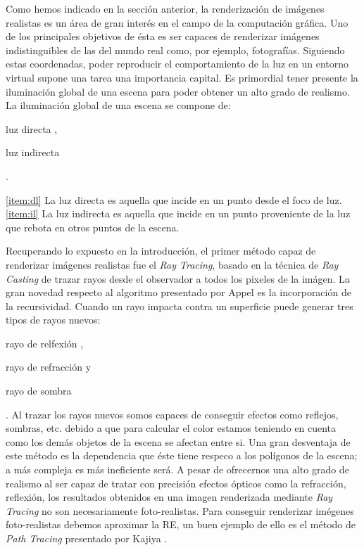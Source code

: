\documentclass[titlepage,12pt]{report}
\begin{document}
Como hemos indicado en la sección anterior, la renderización de imágenes realistas es un área de gran interés en el campo de la computación gráfica. Uno de los principales objetivos de ésta es ser capaces de renderizar imágenes indistinguibles de las del mundo real como, por ejemplo, fotografías. Siguiendo estas coordenadas, poder reproducir el comportamiento de la luz en un entorno virtual supone una tarea una importancia capital. Es primordial tener presente la iluminación global de una escena para poder obtener un alto grado de realismo. La iluminación global de una escena se compone de: \begin{enumerate*}[label=\roman*)] \item luz directa \label{item:dl}, \item luz indirecta \label{item:il} \end{enumerate*}.

\ref{item:dl} La luz directa es aquella que incide en un punto desde el foco de luz. \\
\ref{item:il} La luz indirecta es aquella que incide en un punto proveniente de la luz que rebota en otros puntos de la escena.

Recuperando lo expuesto en la introducción, el primer método capaz de renderizar imágenes realistas fue el \textit{Ray Tracing}, basado en la técnica de \textit{Ray Casting} de trazar rayos desde el observador a todos los pixeles de la imágen. La gran novedad respecto al algoritmo presentado por Appel \cite{Appel1968} es la incorporación de la recursividad. Cuando un rayo impacta contra un superficie puede generar tres tipos de rayos nuevos: \begin{enumerate*}[label=\roman*)] \item rayo de relfexión \label{ray:reflected}, \item rayo de refracción y \item rayo de sombra \end{enumerate*}. Al trazar los rayos nuevos somos capaces de conseguir efectos como reflejos, sombras, etc. debido a que para calcular el color estamos teniendo en cuenta como los demás objetos de la escena se afectan entre si. Una gran desventaja de este método es la dependencia que éste tiene respeco a los polígonos de la escena; a más compleja es más ineficiente será. A pesar de ofrecernos una alto grado de realismo al ser capaz de tratar con precisión efectos ópticos como la refracción, reflexión, los resultados obtenidos en una imagen renderizada mediante \textit{Ray Tracing} no son necesariamente foto-realistas. Para conseguir renderizar imégenes foto-realistas debemos aproximar la RE, un buen ejemplo de ello es el método de \textit{Path Tracing} presentado por Kajiya \cite{Kajiya1986}.
\end{document}
